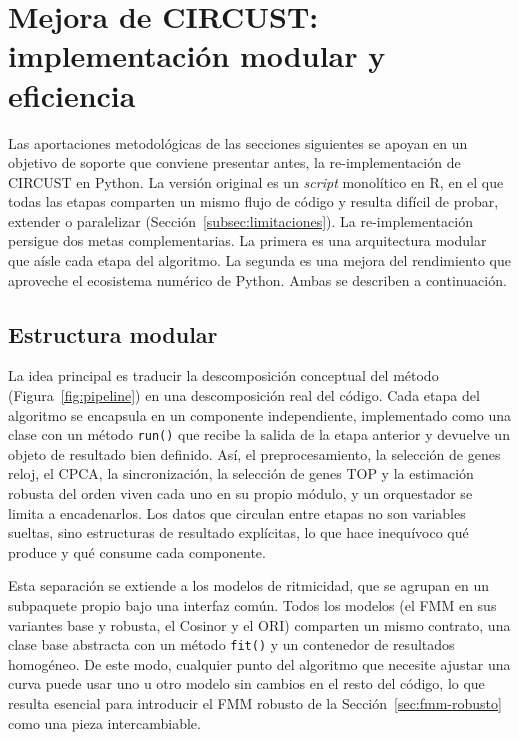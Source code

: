 \documentclass[12pt, a4paper]{report}
\begin{document}

\section{Mejora de CIRCUST: implementación modular y eficiencia}
\label{sec:implementacion}

Las aportaciones metodológicas de las secciones siguientes se apoyan en un objetivo de soporte que conviene presentar antes, la re-implementación de CIRCUST en Python. La versión original es un \textit{script} monolítico en R, en el que todas las etapas comparten un mismo flujo de código y resulta difícil de probar, extender o paralelizar (Sección~\ref{subsec:limitaciones}). La re-implementación persigue dos metas complementarias. La primera es una arquitectura modular que aísle cada etapa del algoritmo. La segunda es una mejora del rendimiento que aproveche el ecosistema numérico de Python. Ambas se describen a continuación.

\subsection{Estructura modular}
\label{subsec:modular}

La idea principal es traducir la descomposición conceptual del método (Figura~\ref{fig:pipeline}) en una descomposición real del código. Cada etapa del algoritmo se encapsula en un componente independiente, implementado como una clase con un método \texttt{run()} que recibe la salida de la etapa anterior y devuelve un objeto de resultado bien definido. Así, el preprocesamiento, la selección de genes reloj, el CPCA, la sincronización, la selección de genes TOP y la estimación robusta del orden viven cada uno en su propio módulo, y un orquestador se limita a encadenarlos. Los datos que circulan entre etapas no son variables sueltas, sino estructuras de resultado explícitas, lo que hace inequívoco qué produce y qué consume cada componente.

Esta separación se extiende a los modelos de ritmicidad, que se agrupan en un subpaquete propio bajo una interfaz común. Todos los modelos (el FMM en sus variantes base y robusta, el Cosinor y el ORI) comparten un mismo contrato, una clase base abstracta con un método \texttt{fit()} y un contenedor de resultados homogéneo. De este modo, cualquier punto del algoritmo que necesite ajustar una curva puede usar uno u otro modelo sin cambios en el resto del código, lo que resulta esencial para introducir el FMM robusto de la Sección~\ref{sec:fmm-robusto} como una pieza intercambiable.
\end{document}
